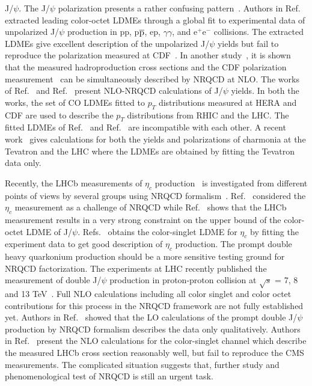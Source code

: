 \documentclass[12pt,a4paper,final]{iopart}
\begin{document}
J/$\psi$. The J/$\psi$ polarization presents a rather confusing 
pattern~\cite{Butenschoen:2012px, Butenschoen:2012qr, Chao:2012iv,Gong:2012ug}.
{\color{black}
Authors in Ref.~\cite{Butenschoen:2012qr} extracted leading color-octet LDMEs
through a global fit to experimental data of unpolarized J/$\psi$ production in 
pp, p$\overline{\rm p}$, ep, $\gamma \gamma$, 
and e$^{+}$e$^{-}$ collisions. The extracted LDMEs give excellent description of the 
unpolarized J/$\psi$ yields but fail to reproduce the  polarization measured at 
CDF~\cite{Abulencia:2007us}. In another study~\cite{Chao:2012iv}, it is shown 
that the measured hadroproduction cross sections and the CDF polarization 
measurement~\cite{Abulencia:2007us} can be simultaneously described by NRQCD at NLO.
}
The works of Ref.~\cite{Butenschoen:2010rq,Butenschoen:2011yh} and  Ref.~\cite{Ma:2010yw} present
NLO-NRQCD calculations of J/$\psi$ yields. In both the works, the set of CO LDMEs 
fitted to $p_{T}$ distributions measured at HERA and CDF are used to describe 
the $p_{T}$ distributions from RHIC and the LHC.
The fitted LDMEs of Ref.~\cite{Butenschoen:2010rq} and  Ref.~\cite{Ma:2010yw}
are incompatible with each other. A recent work~\cite{Shao:2014yta} gives 
calculations for both the yields and polarizations of charmonia at the Tevatron 
and the LHC where the LDMEs are obtained by fitting the Tevatron data only.

{\color{black}
  Recently, the LHCb measurements of $\eta_{c}$ production~\cite{Aaij:2014bga} 
  is investigated from different points of views by several groups using  
  NRQCD formalism~\cite{Butenschoen:2014dra,Han:2014jya,Zhang:2014ybe}.   
  Ref.~\cite{Butenschoen:2014dra} considered the $\eta_{ c}$ measurement as a challenge of NRQCD 
  while Ref.~\cite{Han:2014jya} shows that the LHCb measurement results in a very 
  strong constraint on the upper bound of the color-octet LDME of J/$\psi$.
  Refs.~\cite{Zhang:2014ybe} obtains the color-singlet LDME for 
  $\eta_c$ by fitting the experiment data to get good description of $\eta_c$ production.
  The prompt double heavy quarkonium production should be a more sensitive testing 
  ground for NRQCD factorization. The experiments at LHC recently published 
  the measurement of double J/$\psi$ production in proton-proton collision at $ \sqrt{s} $ 
  = 7, 8 and 13 TeV~\cite{Aaij:2011yc,Khachatryan:2014iia,Aaboud:2016fzt,Aaij:2016bqq}. 
  Full NLO calculations including all color singlet and color octet contributions 
  for this process in the NRQCD framework are not fully established yet. 
  Authors in Ref.~\cite{He:2015qya} showed that the LO calculations of the prompt double J/$\psi$ 
  production by NRQCD formalism describes the data only qualitatively.
  Authors in Ref.~\cite{Sun:2014gca} present the NLO calculations for the color-singlet channel
  which describe the measured LHCb cross section reasonably well, but fail to reproduce the CMS 
  measurements. The complicated situation suggests that, further study and phenomenological test of NRQCD is still an 
  urgent task.
}
\end{document}
